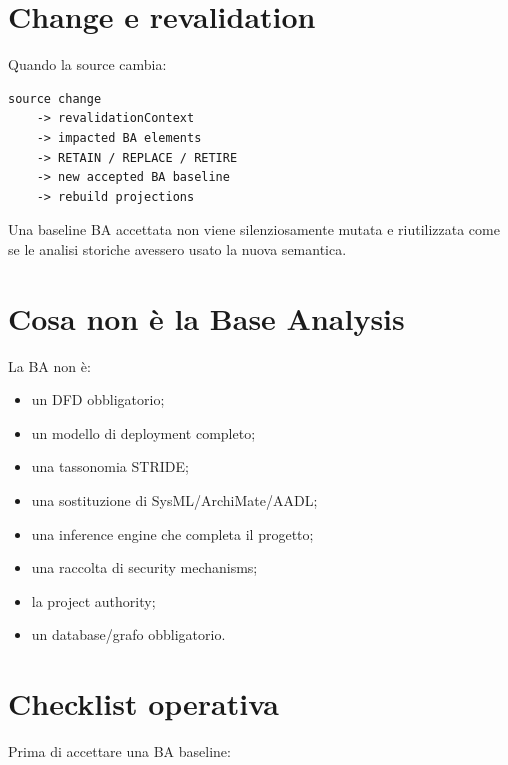 \documentclass[11pt,a4paper]{article}
\begin{document}
\section{Change e revalidation}

Quando la source cambia:

\begin{lstlisting}
source change
    -> revalidationContext
    -> impacted BA elements
    -> RETAIN / REPLACE / RETIRE
    -> new accepted BA baseline
    -> rebuild projections
\end{lstlisting}

Una baseline BA accettata non viene silenziosamente mutata e riutilizzata come se le analisi storiche avessero usato la nuova semantica.

\section{Cosa non è la Base Analysis}

La BA non è:

\begin{itemize}
\item un DFD obbligatorio;
\item un modello di deployment completo;
\item una tassonomia STRIDE;
\item una sostituzione di SysML/ArchiMate/AADL;
\item una inference engine che completa il progetto;
\item una raccolta di security mechanisms;
\item la project authority;
\item un database/grafo obbligatorio.
\end{itemize}

\section{Checklist operativa}

Prima di accettare una BA baseline:
\end{document}
